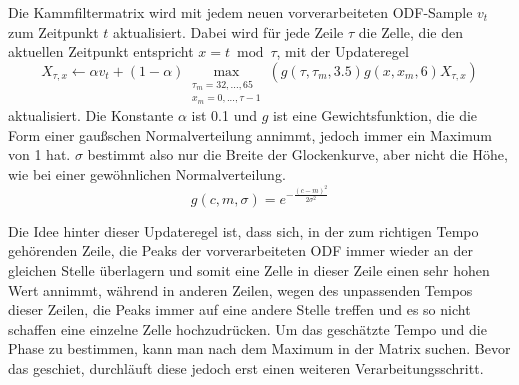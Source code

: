 {{{			%
			Die Kammfiltermatrix wird mit jedem neuen vorverarbeiteten ODF-Sample $v_t$ zum Zeitpunkt $t$ aktualisiert.
			Dabei wird für jede Zeile $\tau$ die Zelle,
				die den aktuellen Zeitpunkt entspricht $x = t \bmod \tau$,
				mit der Updateregel
				\begin{equation}
					X_{\tau, x} \leftarrow
						\alpha v_t +
						(1 - \alpha) \max_{\substack{\tau_m = 32, ..., 65 \\ x_m = 0, ..., \tau - 1}}(g(\tau, \tau_m, 3.5) g(x, x_m, 6) X_{\tau, x})
				\end{equation}
				aktualisiert.
			Die Konstante $\alpha$ ist \num{0.1}
				und $g$ ist eine Gewichtsfunktion,
				die die Form einer gaußschen Normalverteilung annimmt,
				jedoch immer ein Maximum von \num{1} hat.
			$\sigma$ bestimmt also nur die Breite der Glockenkurve,
				aber nicht die Höhe,
				wie bei einer gewöhnlichen Normalverteilung.
			\begin{equation}
				g(c, m, \sigma) = e^{-\frac{(c - m)^2}{2\sigma^2}}
			\end{equation}

			Die Idee hinter dieser Updateregel ist,
				dass sich,
				in der zum richtigen Tempo gehörenden Zeile,
				die Peaks der vorverarbeiteten ODF immer wieder an der gleichen Stelle überlagern
				und somit eine Zelle in dieser Zeile einen sehr hohen Wert annimmt,
				während in anderen Zeilen,
				wegen des unpassenden Tempos dieser Zeilen,
				die Peaks immer auf eine andere Stelle treffen
				und es so nicht schaffen eine einzelne Zelle hochzudrücken.
			Um das geschätzte Tempo und die Phase zu bestimmen,
				kann man nach dem Maximum in der Matrix suchen.
			Bevor das geschiet,
				durchläuft diese jedoch erst einen weiteren Verarbeitungsschritt.

}}}
